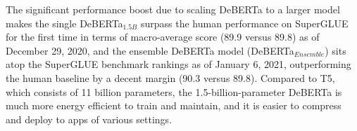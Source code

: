 The significant performance boost due to scaling DeBERTa to a larger model makes the single DeBERTa$_{1.5B}$ surpass the human performance on SuperGLUE for the first time in terms of macro-average score (89.9 versus 89.8) as of December 29, 2020, and the ensemble DeBERTa model (DeBERTa$_{Ensemble}$) sits atop the SuperGLUE benchmark rankings as of January 6, 2021, outperforming the human baseline by a decent margin (90.3 versus 89.8). 
Compared to T5, which consists of 11 billion parameters, the 1.5-billion-parameter DeBERTa is much more energy efficient to train and maintain, and it is easier to compress and deploy to apps of various settings.


